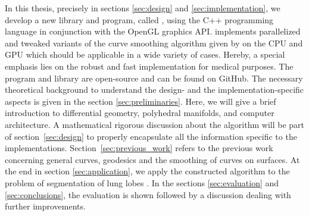 \documentclass{stdlocal}
\begin{document}
In this thesis, precisely in sections \ref{sec:design} and \ref{sec:implementation}, we develop a new library and program, called , using the C++ programming language in conjunction with the OpenGL graphics API.
 implements parallelized and tweaked variants of the curve smoothing algorithm given by \textcite{lawonn2014} on the CPU and GPU which should be applicable in a wide variety of cases.
Hereby, a special emphasis lies on the robust and fast implementation for medical purposes.
The program and library are open-source and can be found on GitHub.
The necessary theoretical background to understand the design- and the implementation-specific aspects is given in the section \ref{sec:preliminaries}.
Here, we will give a brief introduction to differential geometry, polyhedral manifolds, and computer architecture.
A mathematical rigorous discussion about the algorithm will be part of section~\ref{sec:design} to properly encapsulate all the information specific to the implementations.
Section~\ref{sec:previous_work} refers to the previous work concerning general curves, geodesics and the smoothing of curves on surfaces.
At the end in section \ref{sec:application}, we apply the constructed algorithm to the problem of segmentation of lung lobes \autocite{park2019}.
In the sections \ref{sec:evaluation} and \ref{sec:conclusions}, the evaluation is shown followed by a discussion dealing with further improvements.

\end{document}
